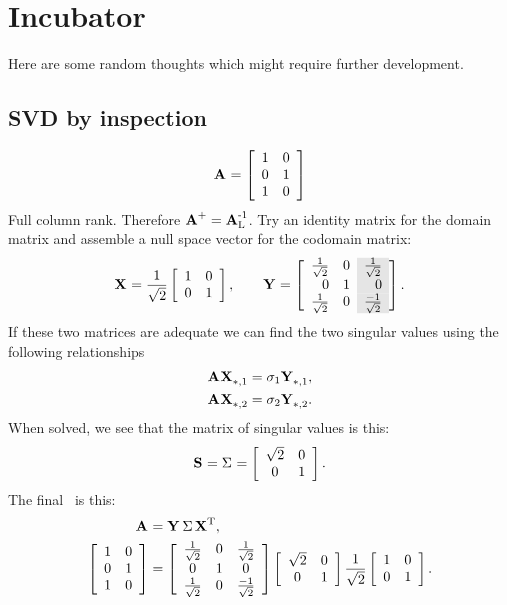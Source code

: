 \chapter[]{Incubator}
Here are some random thoughts which might require further development.

\section{SVD by inspection}
\begin{equation}
  \A{} = \mat{cc}{1&0\\0&1\\1&0}
\end{equation}
Full column rank. Therefore $\Ap = \AinvL$. Try an identity matrix for the domain matrix and assemble a null space vector for the codomain matrix: 
\begin{equation}
  \X{} = \stwo\itwo, \qquad \Y{} = \mat{rr>{\columncolor{ltgray}}r}{\stwo & 0 & \stwo \\ 0 & 1 & 0 \\ \stwo & 0 & \frac{-1}{\sqrt{2}}}.
\end{equation}
If these two matrices are adequate we can find the two singular values using the following relationships
\begin{equation}
  \begin{split}
    \A{}\X{}_{*,1} & = \sigma_{1}\Y{}_{*,1},\\
    \A{}\X{}_{*,2} & = \sigma_{2}\Y{}_{*,2}.\\
  \end{split}
\end{equation}
When solved, we see that the matrix of singular values is this:
\begin{equation}
  \ess{} = \sig{} = \mat{cc}{\sqrt{2} & 0 \\ 0 & 1}.
\end{equation}
The final \svdl \ is this:
\begin{equation}
  \begin{split}
    \svda{T},\\
     \mat{cc}{1&0\\0&1\\1&0} & = 
     \mat{ccc}{\stwo & 0 & \stwo \\ 0 & 1 & 0 \\ \stwo & 0 & \frac{-1}{\sqrt{2}}}
     \mat{cc} {\sqrt{2} & 0 \\ 0 & 1}
     \stwo \itwo.
  \end{split}
\end{equation}

